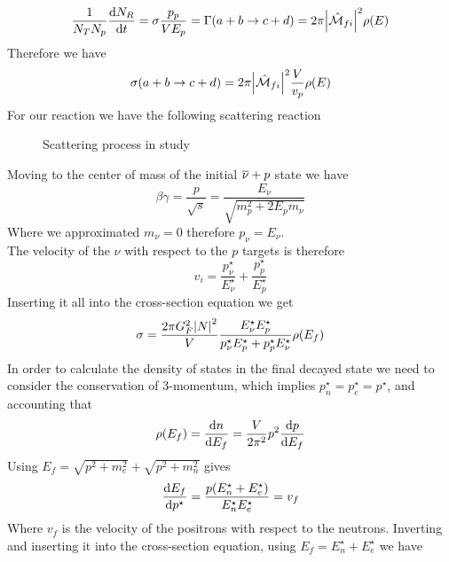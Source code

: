 \documentclass[../qm.tex]{subfiles}
\begin{document}
\begin{equation*}
	\frac{1}{N_TN_p}\dv{N_R}{t}=\sigma\frac{p_p}{VE_p}=\Gamma(a+b\to c+d)=2\pi\abs{\hat{\mathcal{M}}_{fi}}^2\rho(E)
\end{equation*}
Therefore we have
\begin{equation}
	\sigma(a+b\to c+d)=2\pi\abs{\hat{\mathcal{M}}_{fi}}^2\frac{V}{v_p}\rho(E)
	\label{eq:sigmafermirule}
\end{equation}
For our reaction we have the following scattering reaction
\begin{figure}[H]
	\centering
	\caption{Scattering process in study}
	\label{fig:protonneutrinoscatter}
\end{figure}
Moving to the center of mass of the initial $\overline{\nu}+p$ state we have
\begin{equation*}
	\beta\gamma=\frac{p}{\sqrt{s}}=\frac{E_\nu}{\sqrt{m_p^2+2E_pm_\nu}}
\end{equation*}
Where we approximated $m_\nu=0$ therefore $p_\nu=E_\nu$.\\
The velocity of the $\nu$ with respect to the $p$ targets is therefore
\begin{equation*}
	v_i=\frac{p_\nu^\star}{E_\nu^\star}+\frac{p_p^\star}{E_p^\star}
\end{equation*}
Inserting it all into the cross-section equation we get
\begin{equation*}
	\sigma=\frac{2\pi G_F^2\abs{N}^2}{V}\frac{E_\nu^\star E_p^\star}{p_\nu^\star E_p^\star+p_p^\star E_\nu^\star}\rho(E_f)
\end{equation*}
In order to calculate the density of states in the final decayed state we need to consider the conservation of 3-momentum, which implies $p^\star_n=p^\star_e=p^\star$, and accounting that
\begin{equation*}
	\rho(E_f)=\dv{n}{E_f}=\frac{V}{2\pi^2}p^2\dv{p}{E_f}
\end{equation*}
Using $E_f=\sqrt{p^2+m_e^2}+\sqrt{p^2+m_n^2}$ gives
\begin{equation*}
	\dv{E_f}{p^\star}=\frac{p(E_n^\star+E_e^\star)}{E_n^\star E_e^\star}=v_f
\end{equation*}
Where $v_f$ is the velocity of the positrons with respect to the neutrons. Inverting and inserting it into the cross-section equation, using $E_f=E_n^\star+E_e^\star$ we have
\end{document}
